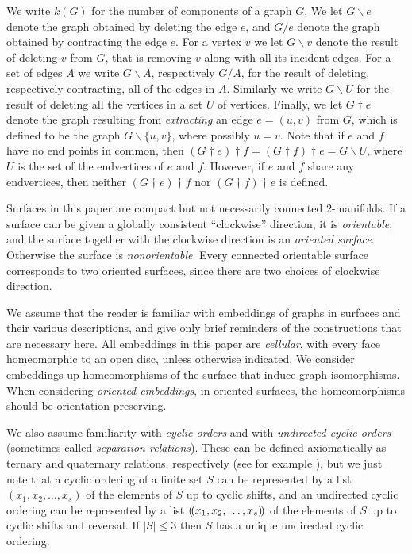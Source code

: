 \documentclass{amsart}
\def\ouco{(\mskip-3mu(}
\def\cuco{)\mskip-3mu)}
\newcommand{\ba}{\mathbin{\backslash}}
\newcommand{\ext}{\mathbin{\dagger}}
\theoremstyle{definition}
\theoremstyle{remark}
\numberwithin{equation}{section}
\begin{document}
We write $k(G)$ for the number of components of a graph $G$. 
We let $G \ba e$  denote the graph obtained by deleting the edge $e$, and $G / e$  denote the graph obtained by contracting the edge $e$.
For a vertex $v$ we let $G \ba v$  denote the result of deleting $v$  from $G$, that is removing $v$ along with all its incident edges. 
For a set  of edges $A$ we write $G \ba A$, respectively $G / A$, for the result of deleting, respectively contracting, all of the edges in $A$. Similarly we write $G \ba U$ for the result of deleting all the vertices in a set $U$ of vertices.
Finally, we let  $G\ext e$ denote  the graph resulting from  \emph{extracting} an edge $e=(u,v)$ from $G$, which is defined to be the graph $G \ba \{u, v\}$, where possibly $u=v$.
Note that if $e$ and $f$ have no end points in common, then $(G\ext e) \ext f = (G\ext f) \ext e = G \ba U$, where $U$ is the set of the endvertices of $e$ and $f$.  However, if $e$ and $f$ share any endvertices, then neither $(G\ext e) \ext f$ nor $(G\ext f) \ext e$ is defined.


\medskip

Surfaces in this paper are compact but not necessarily connected $2$-manifolds.  If a surface can be given a globally consistent ``clockwise'' direction, it is \emph{orientable}, and the surface together with the clockwise direction is an \emph{oriented surface}.  Otherwise the surface is \emph{nonorientable}.
Every connected orientable surface corresponds to two oriented surfaces, since there are two choices of clockwise direction.


We assume that the reader is familiar with embeddings of graphs in surfaces and their various descriptions, and give only brief reminders of the constructions that are necessary here.  All embeddings in this paper are \emph{cellular}, with every face homeomorphic to an open disc, unless otherwise indicated.  We consider embeddings up homeomorphisms of the surface that induce graph isomorphisms.  When considering \emph{oriented embeddings}, in oriented surfaces, the homeomorphisms should be orientation-preserving.


\medskip

We also assume familiarity with \emph{cyclic orders} and with \emph{undirected cyclic orders} (sometimes called \emph{separation relations}).  These can be defined axiomatically as ternary and quaternary relations, respectively (see for example \cite{Hun35}), but we just note that a cyclic ordering of a finite set $S$ can be represented by a list $(x_1, x_2, \dots, x_s)$ of the elements of $S$ up to cyclic shifts, and an undirected cyclic ordering can be represented by a list $\ouco x_1, x_2 ,\dots, x_s \cuco$ of the elements of $S$ up to cyclic shifts and  reversal. If $|S| \le 3$ then $S$ has a unique undirected cyclic ordering.
\end{document}
